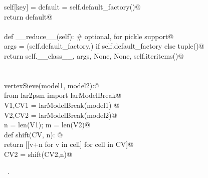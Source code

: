 \documentclass[11pt,oneside]{article}	%
\begin{document}
\begin{flushleft}
\begin{list}{}{}
\mbox{}\verb@        self[key] = default = self.default_factory()@\\
\mbox{}\verb@        return default@\\
\mbox{}\verb@@\\
\mbox{}\verb@    def __reduce__(self):  # optional, for pickle support@\\
\mbox{}\verb@        args = (self.default_factory,) if self.default_factory else tuple()@\\
\mbox{}\verb@        return self.__class__, args, None, None, self.iteritems()@\\
\mbox{}\verb@@\\
\mbox{}\verb@@\\
\mbox{}\verb@def vertexSieve(model1, model2):@\\
\mbox{}\verb@   from lar2psm import larModelBreak@\\
\mbox{}\verb@   V1,CV1 = larModelBreak(model1) @\\
\mbox{}\verb@   V2,CV2 = larModelBreak(model2)@\\
\mbox{}\verb@   n = len(V1); m = len(V2)@\\
\mbox{}\verb@   def shift(CV, n): @\\
\mbox{}\verb@      return [[v+n for v in cell] for cell in CV]@\\
\mbox{}\verb@   CV2 = shift(CV2,n)@\\
\mbox{}\verb@@{\NWsep}
\end{list}
\vspace{-1ex}
\footnotesize\addtolength{\baselineskip}{-1ex}
\begin{list}{}{\setlength{\itemsep}{-\parsep}\setlength{\itemindent}{-\leftmargin}}
\item \NWtxtMacroRefIn\ .
\end{list}
\end{flushleft}
\end{document}
